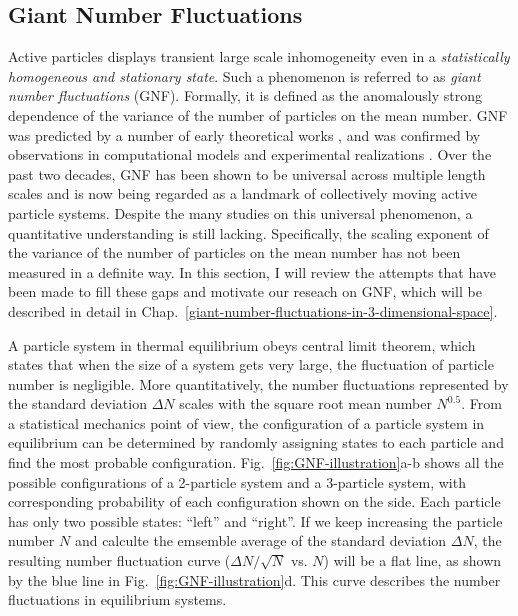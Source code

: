 \subsection{Giant Number Fluctuations}
\label{sec:intro-GNF}
Active particles displays transient large scale inhomogeneity even in a \textit{statistically homogeneous and stationary state}.
Such a phenomenon is referred to as \textit{giant number fluctuations} (GNF). Formally, it is defined as the anomalously strong dependence of the variance of the number of particles on the mean number.
GNF was predicted by a number of early theoretical works \cite{Toner1995, Toner1998,
Tu1998, Simha2002, Ramaswamy2003, Saintillan2008a, Saintillan2008b, Ramaswamy2010}, and was confirmed by observations in computational models
\cite{Mishra2006, Chate2008, Dey2012, Saintillan2012, Ngo2014, Mahault2019} and experimental realizations
\cite{Narayan2007, Aranson2008, Zhang2010, Deseigne2010, Schaller2013, Palacci2013,
Kawaguchi2017, Nishiguchi2017, Karani2019}. Over the past two decades, GNF has been shown to be universal across multiple length scales and is now being regarded as a landmark of collectively moving active particle systems. Despite the many studies on this universal phenomenon, a quantitative understanding is still lacking. Specifically, the scaling exponent of the variance of the number of particles on the mean number has not been measured in a definite way. In this section, I will review the attempts that have been made to fill these gaps and motivate our reseach on GNF, which will be described in detail in Chap.~\ref{giant-number-fluctuations-in-3-dimensional-space}.

A particle system in thermal equilibrium obeys central limit theorem, which states that when the size of a system gets very large, the fluctuation of particle number is negligible. More quantitatively, the number fluctuations represented by the standard deviation $\Delta N$ scales with the square root mean number $N^{0.5}$. From a statistical mechanics point of view, the configuration of a particle system in equilibrium can be determined by randomly assigning states to each particle and find the most probable configuration. Fig.~\ref{fig:GNF-illustration}a-b shows all the possible configurations of a 2-particle system and a 3-particle system, with corresponding probability of each configuration shown on the side. Each particle has only two possible states: ``left'' and ``right''. If we keep increasing the particle number $N$ and calculte the emsemble average of the standard deviation $\Delta N$, the resulting number fluctuation curve ($\Delta N/\sqrt N$ vs. $N$) will be a flat line, as shown by the blue line in Fig.~\ref{fig:GNF-illustration}d. This curve describes the number fluctuations in equilibrium systems.

